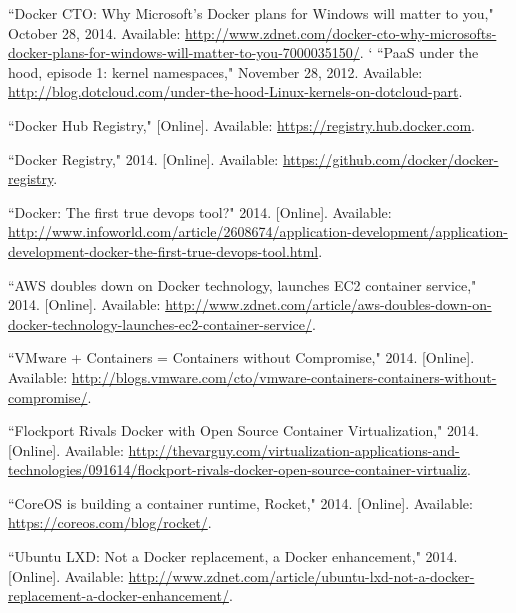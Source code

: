 
\begin{thebibliography}{99}
\begin{singlespace}
\raggedright

``Docker CTO: Why Microsoft's Docker plans for Windows will matter to you," October 28, 2014. Available: \url{http://www.zdnet.com/docker-cto-why-microsofts-docker-plans-for-windows-will-matter-to-you-7000035150/}.
`
``PaaS under the hood, episode 1: kernel namespaces," November 28, 2012. Available: \url{http://blog.dotcloud.com/under-the-hood-Linux-kernels-on-dotcloud-part}.

``Docker Hub Registry," [Online]. Available: \url{https://registry.hub.docker.com}.

``Docker Registry," 2014. [Online]. Available: \url{https://github.com/docker/docker-registry}.

``Docker: The first true devops tool?" 2014. [Online]. Available: \url{http://www.infoworld.com/article/2608674/application-development/application-development-docker-the-first-true-devops-tool.html}.

``AWS doubles down on Docker technology, launches EC2 container service," 2014. [Online]. Available: \url{http://www.zdnet.com/article/aws-doubles-down-on-docker-technology-launches-ec2-container-service/}.

``VMware + Containers = Containers without Compromise," 2014. [Online]. Available: \url{http://blogs.vmware.com/cto/vmware-containers-containers-without-compromise/}.

``Flockport Rivals Docker with Open Source Container Virtualization," 2014. [Online]. Available: \url{http://thevarguy.com/virtualization-applications-and-technologies/091614/flockport-rivals-docker-open-source-container-virtualiz}.

``CoreOS is building a container runtime, Rocket," 2014. [Online]. Available: \url{https://coreos.com/blog/rocket/}.

``Ubuntu LXD: Not a Docker replacement, a Docker enhancement," 2014. [Online]. Available: \url{http://www.zdnet.com/article/ubuntu-lxd-not-a-docker-replacement-a-docker-enhancement/}.


\end{singlespace}
\end{thebibliography}
